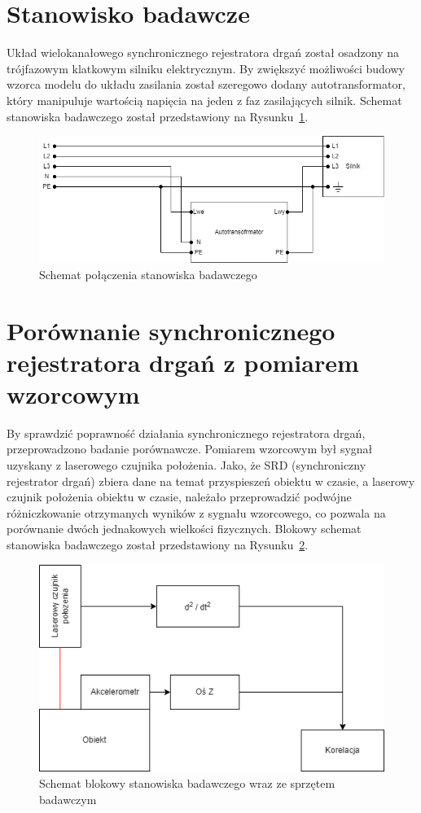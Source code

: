 \documentclass[a4paper, 12pt]{mwart}
\title{}
\author{}
\date{}
\begin{document}
\maketitle

\section{Stanowisko badawcze}
Układ wielokanałowego synchronicznego rejestratora drgań został osadzony na trójfazowym klatkowym silniku elektrycznym. By zwiększyć możliwości budowy wzorca modelu do układu zasilania został szeregowo dodany autotransformator, który manipuluje wartością napięcia na jeden z faz zasilających silnik. Schemat stanowiska badawczego został przedstawiony na Rysunku~\ref{fig:circut}.

\begin{figure}[th]
	\centering
	\includegraphics[width=0.9\linewidth]{assets/circut}
	\caption{Schemat połączenia stanowiska badawczego}
	\label{fig:circut}
\end{figure}

\section{Porównanie synchronicznego rejestratora drgań z pomiarem wzorcowym}
By sprawdzić poprawność działania synchronicznego rejestratora drgań, przeprowadzono badanie porównawcze. Pomiarem wzorcowym był sygnał uzyskany z laserowego czujnika położenia. Jako, że SRD (synchroniczny rejestrator drgań) zbiera dane na temat przyspieszeń obiektu w czasie, a laserowy czujnik położenia obiektu w czasie, należało przeprowadzić podwójne różniczkowanie otrzymanych wyników z sygnału wzorcowego, co pozwala na porównanie dwóch jednakowych wielkości fizycznych. 
Blokowy schemat stanowiska badawczego został przedstawiony na Rysunku~\ref{fig:wibro1}. 
\begin{figure}[th]
	\centering
	\includegraphics[width=0.8\linewidth]{assets/wibro1.drawio}
	\caption{Schemat blokowy stanowiska badawczego wraz ze sprzętem badawczym}
	\label{fig:wibro1}
\end{figure}
\end{document}
